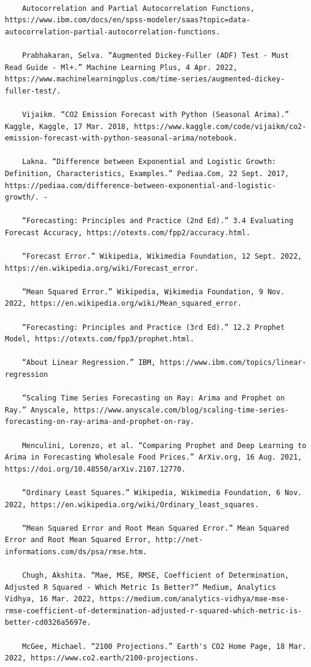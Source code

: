 \documentclass[12pt]{mcmthesis}
\begin{document}
    \lstset{
        basicstyle=\smaller\ttfamily,
        columns=flexible,
        breaklines=true
    }
    \begin{lstlisting}

    Autocorrelation and Partial Autocorrelation Functions, https://www.ibm.com/docs/en/spss-modeler/saas?topic=data-autocorrelation-partial-autocorrelation-functions.

    Prabhakaran, Selva. “Augmented Dickey-Fuller (ADF) Test - Must Read Guide - Ml+.” Machine Learning Plus, 4 Apr. 2022, https://www.machinelearningplus.com/time-series/augmented-dickey-fuller-test/.

    Vijaikm. “CO2 Emission Forecast with Python (Seasonal Arima).” Kaggle, Kaggle, 17 Mar. 2018, https://www.kaggle.com/code/vijaikm/co2-emission-forecast-with-python-seasonal-arima/notebook.

    Lakna. “Difference between Exponential and Logistic Growth: Definition, Characteristics, Examples.” Pediaa.Com, 22 Sept. 2017, https://pediaa.com/difference-between-exponential-and-logistic-growth/. -

    “Forecasting: Principles and Practice (2nd Ed).” 3.4 Evaluating Forecast Accuracy, https://otexts.com/fpp2/accuracy.html.

    “Forecast Error.” Wikipedia, Wikimedia Foundation, 12 Sept. 2022, https://en.wikipedia.org/wiki/Forecast_error.

    “Mean Squared Error.” Wikipedia, Wikimedia Foundation, 9 Nov. 2022, https://en.wikipedia.org/wiki/Mean_squared_error.

    “Forecasting: Principles and Practice (3rd Ed).” 12.2 Prophet Model, https://otexts.com/fpp3/prophet.html.

    “About Linear Regression.” IBM, https://www.ibm.com/topics/linear-regression

    “Scaling Time Series Forecasting on Ray: Arima and Prophet on Ray.” Anyscale, https://www.anyscale.com/blog/scaling-time-series-forecasting-on-ray-arima-and-prophet-on-ray.

    Menculini, Lorenzo, et al. “Comparing Prophet and Deep Learning to Arima in Forecasting Wholesale Food Prices.” ArXiv.org, 16 Aug. 2021, https://doi.org/10.48550/arXiv.2107.12770.

    “Ordinary Least Squares.” Wikipedia, Wikimedia Foundation, 6 Nov. 2022, https://en.wikipedia.org/wiki/Ordinary_least_squares.

    “Mean Squared Error and Root Mean Squared Error.” Mean Squared Error and Root Mean Squared Error, http://net-informations.com/ds/psa/rmse.htm.

    Chugh, Akshita. “Mae, MSE, RMSE, Coefficient of Determination, Adjusted R Squared - Which Metric Is Better?” Medium, Analytics Vidhya, 16 Mar. 2022, https://medium.com/analytics-vidhya/mae-mse-rmse-coefficient-of-determination-adjusted-r-squared-which-metric-is-better-cd0326a5697e.

    McGee, Michael. “2100 Projections.” Earth's CO2 Home Page, 18 Mar. 2022, https://www.co2.earth/2100-projections.
    \end{lstlisting}
\end{document}
